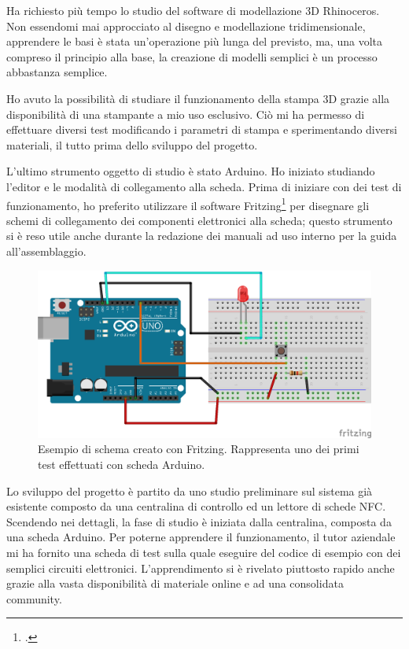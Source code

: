 \medskip

Ha richiesto più tempo lo studio del software di modellazione 3D Rhinoceros. Non essendomi mai approcciato al disegno e modellazione tridimensionale, apprendere le basi è stata un'operazione più lunga del previsto, ma, una volta compreso il principio alla base, la creazione di modelli semplici è un processo abbastanza semplice.

Ho avuto la possibilità di studiare il funzionamento della stampa 3D grazie alla disponibilità di una stampante a mio uso esclusivo. Ciò mi ha permesso di effettuare diversi test modificando i parametri di stampa e sperimentando diversi materiali, il tutto prima dello sviluppo del progetto.

\medskip

L'ultimo strumento oggetto di studio è stato Arduino. Ho iniziato studiando l'editor e le modalità di collegamento alla scheda. Prima di iniziare con dei test di funzionamento, ho preferito utilizzare il software Fritzing\footcite{http://fritzing.org/} per disegnare gli schemi di collegamento dei componenti elettronici alla scheda; questo strumento si è reso utile anche durante la redazione dei manuali ad uso interno per la guida all'assemblaggio.

\begin{figure}[H]
	\begin{center}
	\includegraphics[scale=0.62]{immagini/schema_arduino.png}
	\caption{Esempio di schema creato con Fritzing. Rappresenta uno dei primi test effettuati con scheda Arduino.}
	\end{center}
\end{figure}

\medskip

Lo sviluppo del progetto è partito da uno studio preliminare sul sistema già esistente composto da una centralina di controllo ed un lettore di schede NFC.
Scendendo nei dettagli, la fase di studio è iniziata dalla centralina, composta da una scheda Arduino. Per poterne apprendere il funzionamento, il tutor aziendale mi ha fornito una scheda di test sulla quale eseguire del codice di esempio con dei semplici circuiti elettronici. L'apprendimento si è rivelato piuttosto rapido anche grazie alla vasta disponibilità di materiale online e ad una consolidata community.

